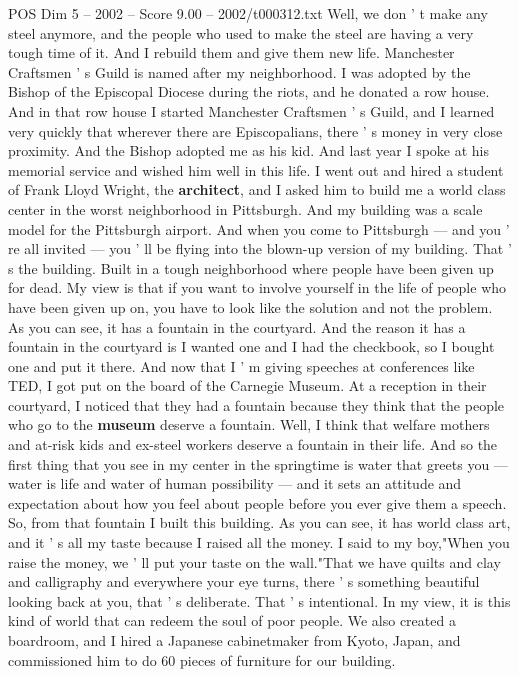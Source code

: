 \begin{textsample}{POS Dim 5 – 2002 – Score 9.00 – 2002/t000312.txt}
Well, we don ' t make any steel anymore, and the people who used to make the steel are having a very tough time of it.
And I rebuild them and give them new life.
Manchester Craftsmen ' s Guild is named after my neighborhood.
I was adopted by the Bishop of the Episcopal Diocese during the riots, and he donated a row house.
And in that row house I started Manchester Craftsmen ' s Guild, and I learned very quickly that wherever there are Episcopalians, there ' s money in very close proximity.
And the Bishop adopted me as his kid.
And last year I spoke at his memorial service and wished him well in this life.
I went out and hired a student of Frank Lloyd Wright, the \textbf{architect}, and I asked him to build me a world class center in the worst neighborhood in Pittsburgh.
And my building was a scale model for the Pittsburgh airport.
And when you come to Pittsburgh — and you ' re all invited — you ' ll be flying into the blown-up version of my building.
That ' s the building.
Built in a tough neighborhood where people have been given up for dead.
My view is that if you want to involve yourself in the life of people who have been given up on, you have to look like the solution and not the problem.
As you can see, it has a fountain in the courtyard.
And the reason it has a fountain in the courtyard is I wanted one and I had the checkbook, so I bought one and put it there.
And now that I ' m giving speeches at conferences like TED, I got put on the board of the Carnegie Museum.
At a reception in their courtyard, I noticed that they had a fountain because they think that the people who go to the \textbf{museum} deserve a fountain.
Well, I think that welfare mothers and at-risk kids and ex-steel workers deserve a fountain in their life.
And so the first thing that you see in my center in the springtime is water that greets you — water is life and water of human possibility — and it sets an attitude and expectation about how you feel about people before you ever give them a speech.
So, from that fountain I built this building.
As you can see, it has world class art, and it ' s all my taste because I raised all the money.
I said to my boy,"When you raise the money, we ' ll put your taste on the wall."That we have quilts and clay and calligraphy and everywhere your eye turns, there ' s something beautiful looking back at you, that ' s deliberate.
That ' s intentional.
In my view, it is this kind of world that can redeem the soul of poor people.
We also created a boardroom, and I hired a Japanese cabinetmaker from Kyoto, Japan, and commissioned him to do 60 pieces of furniture for our building.

\end{textsample}
